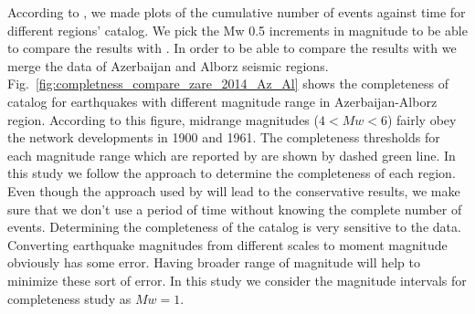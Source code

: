  According to   \citet{Frankel1995},  we made plots of the cumulative number of events against time for different regions' catalog. We pick the Mw 0.5 increments in magnitude to be able to compare the results with \citet{Zare2014}. In order to be able to compare the results with \citet{Zare2014} we merge the data of Azerbaijan and Alborz seismic regions.  Fig.~\ref{fig:completness_compare_zare_2014_Az_Al} shows the completeness of catalog for earthquakes with different magnitude range in Azerbaijan-Alborz region. According to this figure, midrange magnitudes ($ 4 < Mw < 6 $) fairly obey the network developments in 1900 and 1961. The completeness thresholds for each magnitude range which are reported by \citet{Zare2014} are shown by dashed green line. In this study we follow the \citet{Frankel1995} approach to determine the completeness of each region. Even though the approach used by \citet{Frankel1995} will lead to the conservative results, we make sure that we don't use a period of time without knowing the complete number of events. Determining the completeness of the catalog is very sensitive to the data. Converting earthquake magnitudes from different scales to moment magnitude obviously has some error. Having broader range of magnitude will help to minimize these sort of error. In this study we consider the magnitude intervals for completeness study as $Mw = 1$. 

